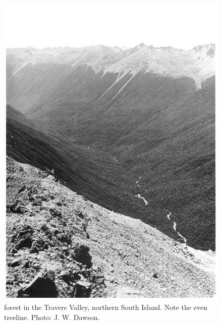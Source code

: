 \begin{figure}[htb]
	\centering
	\begin{minipage}[t]{0.491\textwidth}
		\centering
		\includegraphics[width=\textwidth]{graphics/figure71nothofagus-forest.jpg}
    	\caption[Nothofagus forest in the Travers Valley]{ forest in the Travers Valley, northern South Island.
    	Note the even treeline.
    	Photo: J. W. Dawson.}%
    	\label{fig:71nothofagus-forest}
	\end{minipage}\hfill%
	\begin{minipage}[t]{0.489\textwidth}
    	\centering

\end{minipage}
\end{figure}
